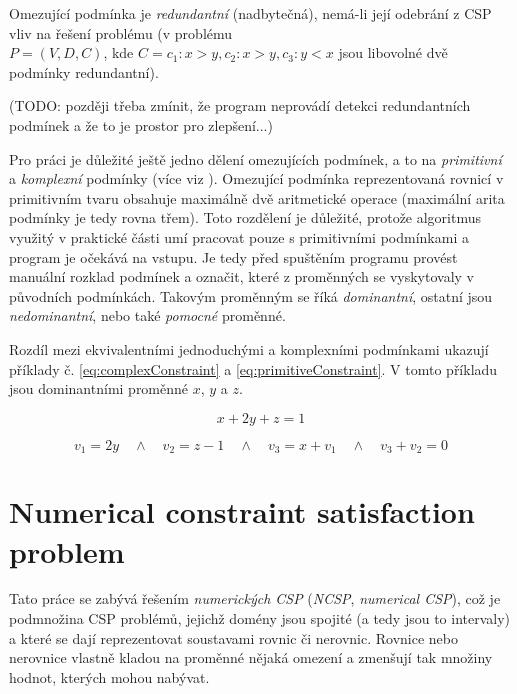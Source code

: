Omezující podmínka je \emph{redundantní} (nadbytečná), nemá-li její odebrání z CSP vliv na řešení problému (v problému \\ $P = (V, D, C)$, kde $C = {c_1: x > y, c_2: x > y, c_3: y < x}$ jsou libovolné dvě podmínky redundantní).

(TODO: později třeba zmínit, že program neprovádí detekci redundantních podmínek a že to je prostor pro zlepšení...)

Pro práci je důležité ještě jedno dělení omezujících podmínek, a to na \emph{primitivní} a \emph{komplexní} podmínky (více viz \cite{kue12}). Omezující podmínka reprezentovaná rovnicí v primitivním tvaru obsahuje maximálně dvě aritmetické operace (maximální arita podmínky je tedy rovna třem). Toto rozdělení je důležité, protože algoritmus využitý v praktické části umí pracovat pouze s primitivními podmínkami a program je očekává na vstupu. Je tedy před spuštěním programu provést manuální rozklad podmínek a označit, které z proměnných se vyskytovaly v původních podmínkách. Takovým proměnným se říká \emph{dominantní}, ostatní jsou \emph{nedominantní}, nebo také \emph{pomocné} proměnné.

Rozdíl mezi ekvivalentními jednoduchými a komplexními podmínkami ukazují příklady č. \ref{eq:complexConstraint} a \ref{eq:primitiveConstraint}. V tomto příkladu jsou dominantními proměnné $x$, $y$ a $z$.

\begin{equation} \label{eq:complexConstraint}
x + 2y + z = 1
\end{equation}

\begin{equation} \label{eq:primitiveConstraint}
v_1 = 2y \quad \wedge \quad v_2 = z - 1 \quad \wedge \quad v_3 = x + v_1 \quad \wedge \quad v_3 + v_2 = 0
\end{equation}





\section{Numerical constraint satisfaction problem}

Tato práce se zabývá řešením \emph{numerických CSP} (\emph{NCSP}, \emph{numerical CSP}), což je podmnožina CSP problémů, jejichž domény jsou spojité (a tedy jsou to intervaly) a které se dají reprezentovat soustavami rovnic či nerovnic. Rovnice nebo nerovnice vlastně kladou na proměnné nějaká omezení a zmenšují tak množiny hodnot, kterých mohou nabývat.

